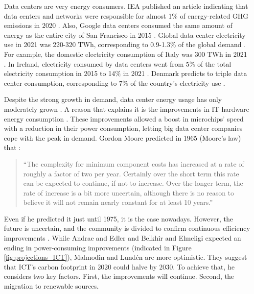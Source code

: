 Data centers are very energy consumers. IEA published an article indicating that data centers and networks were responsible for almost 1\% of energy-related GHG emissions in 2020 \cite{centres2022data}. Also, Google data centers consumed the same amount of energy as the entire city of San Francisco in 2015 \cite{khan2018exploiting}. Global data center electricity use in 2021 was 220-320 TWh, corresponding to 0.9-1.3\% of the global demand \cite{centres2022data}. For example, the domestic electricity consumption of Italy was 300 TWh in 2021 \cite{ElectricityDomesticConsumption}. In Ireland, electricity consumed by data centers went from 5\% of the total electricity consumption in 2015 to 14\% in 2021 \cite{IrelandDatacenter}. Denmark predicts to triple data center consumption, corresponding to 7\% of the country’s electricity use \cite{DenmarkDatacenter}.

Despite the strong growth in demand, data center energy usage has only moderately grown \cite{centres2022data}. A reason that explains it is the improvements in IT hardware energy consumption \cite{centres2022data}. These improvements allowed a boost in microchips' speed with a reduction in their power consumption, letting big data center companies cope with the peak in demand. Gordon Moore predicted in 1965 (Moore's law) that \cite{moore1965cramming}:

\begin{quote}
    ``The complexity for minimum component costs has increased at a rate of roughly a factor of two per year. Certainly over the short term this rate can be expected to continue, if not to increase. Over the longer term, the rate of increase is a bit more uncertain, although there is no reason to believe it will not remain nearly constant for at least 10 years.''
\end{quote}

Even if he predicted it just until 1975, it is the case nowadays. However, the future is uncertain, and the community is divided to confirm continuous efficiency improvements \cite{freitag2021climate}. While Andrae and Edler \cite{andrae2015global} and Belkhir and Elmeligi \cite{belkhir2018assessing} expected an ending in power-consuming improvements (indicated in Figure \ref{fig:projections_ICT}), Malmodin and Lundén \cite{malmodin2018energy} are more optimistic. They suggest that ICT’s carbon footprint in 2020 could halve by 2030. To achieve that, he considers two key factors. First, the improvements will continue. Second, the migration to renewable sources.

